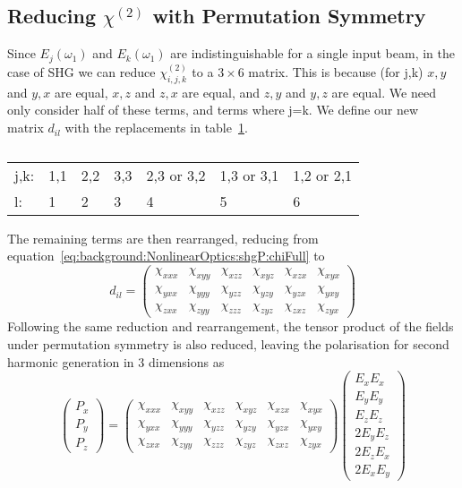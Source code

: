 \subsection{Reducing \texorpdfstring{$\chi^{(2)}$}{Lg} with Permutation Symmetry}\label{sec:background:NonlinearOptics:permutation}
Since $E_{j}(\omega_{1} )$ and $E_{k}(\omega_{1} )$ are indistinguishable for a single input beam, in the case of SHG we can reduce $\chi^{(2)}_{i, j, k}$ to a $3\times6$ matrix. This is because (for j,k) $x,y$ and $y,x$ are equal, $x,z$ and $z,x$ are equal, and $z,y$ and $y,z$ are equal. We need only consider half of these terms, and terms where j=k. We define our new matrix $d_{il}$ with the replacements in table~\ref{table:jkl}.

\begin{table}[H]
\centering
\caption{}
\begin{tabular}{lllllll}
j,k: & 1,1 & 2,2 & 3,3 & 2,3 or 3,2 & 1,3 or 3,1 & 1,2 or 2,1 \\
l:   & 1   & 2   & 3   & 4          & 5          & 6          
\end{tabular}
\label{table:jkl}
\end{table}
The remaining terms are then rearranged, reducing from equation~\ref{eq:background:NonlinearOptics:shgP:chiFull} to
\begin{equation}\label{eq:background:NonlinearOptics:permutation:dil}
	d_{il}=
	\begin{pmatrix}
		\chi_{xxx} & \chi_{xyy} & \chi_{xzz} & \chi_{xyz} & \chi_{xzx} & \chi_{xyx}\\ 
		\chi_{yxx} & \chi_{yyy} & \chi_{yzz} & \chi_{yzy} & \chi_{yzx} & \chi_{yxy}\\ 
		\chi_{zxx} & \chi_{zyy} & \chi_{zzz} & \chi_{zyz} & \chi_{zxz} & \chi_{zyx}
	\end{pmatrix}
\end{equation}
Following the same reduction and rearrangement, the tensor product of the fields under permutation symmetry is also reduced, leaving the polarisation for second harmonic generation in 3 dimensions as
\begin{equation}\label{eq:background:NonlinearOptics:permutation:PshgFull}
	\begin{pmatrix}
		P_{x}\\ 
		P_{y}\\ 
		P_{z}
	\end{pmatrix} =
	\begin{pmatrix}
		\chi_{xxx} & \chi_{xyy} & \chi_{xzz} & \chi_{xyz} & \chi_{xzx} & \chi_{xyx}\\ 
		\chi_{yxx} & \chi_{yyy} & \chi_{yzz} & \chi_{yzy} & \chi_{yzx} & \chi_{yxy}\\ 
		\chi_{zxx} & \chi_{zyy} & \chi_{zzz} & \chi_{zyz} & \chi_{zxz} & \chi_{zyx}
	\end{pmatrix}
	\begin{pmatrix}
		E_{x}E_{x}\\ 
		E_{y}E_{y}\\ 
		E_{z}E_{z}\\
		2E_{y}E_{z}\\ 
		2E_{z}E_{x}\\ 
		2E_{x}E_{y}
	\end{pmatrix}
\end{equation}
